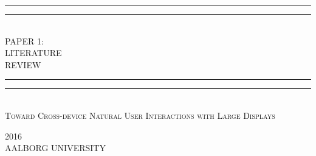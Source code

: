 
\begin{dummy}

	\textheight
	\centering
	\vspace*{\baselineskip}
	\rule{\textwidth}{1.6pt}\vspace*{-\baselineskip}\vspace*{2pt}
	\rule{\textwidth}{0.4pt}\\[\baselineskip]
	{\LARGE PAPER 1: \\ LITERATURE \\[0.3\baselineskip] REVIEW}\\[0.2\baselineskip]
	\rule{\textwidth}{0.4pt}\vspace*{-\baselineskip}\vspace{3.2pt}
	\rule{\textwidth}{1.6pt}\\[\baselineskip]
	\scshape
	{ \large Toward Cross-device Natural User Interactions with Large Displays } \par
	\vspace*{2\baselineskip}
	\vspace*{2\baselineskip}
	\vspace*{2\baselineskip}
	\vspace*{2\baselineskip}
		
		
	\begin{newab}
		
	\end{newab}

	\vspace*{2\baselineskip}
	\vspace*{2\baselineskip}
	\vspace*{2\baselineskip}
	\vspace*{2\baselineskip}
		{\scshape 2016} \\
		{\large AALBORG UNIVERSITY}\par
	
\end{dummy}